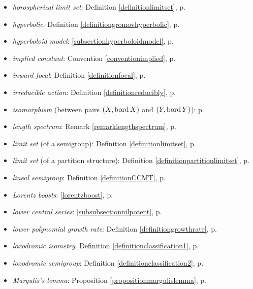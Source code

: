 \begin{itemize}
\item\emph{horospherical limit set}: Definition \ref{definitionlimitset}, p.\pageref{definitionlimitset}
\item\emph{hyperbolic}: Definition \ref{definitiongromovhyperbolic}, p.\pageref{definitiongromovhyperbolic}
\item\emph{hyperboloid model}: \6\ref{subsectionhyperboloidmodel}, p.\pageref{subsectionhyperboloidmodel}
\item\emph{implied constant}: Convention \ref{conventionimplied}, p.\pageref{conventionimplied}
\item\emph{inward focal}: Definition \ref{definitionfocal}, p.\pageref{definitionfocal}
\item\emph{irreducible action}: Definition \ref{definitionreducibly}, p.\pageref{definitionreducibly}
\item\emph{isomorphism} (between pairs $(X,\operatorname{bord} X)$ and $(Y,\operatorname{bord} Y)$): p.\pageref{subsectiontotallygeodesic}
\item\emph{length spectrum}: Remark \ref{remarklengthspectrum}, p.\pageref{remarklengthspectrum}
\item\emph{limit set} (of a semigroup): Definition \ref{definitionlimitset}, p.\pageref{definitionlimitset}
\item\emph{limit set} (of a partition structure): Definition \ref{definitionpartitionlimitset}, p.\pageref{definitionpartitionlimitset}
\item\emph{lineal semigroup}: Definition \ref{definitionCCMT}, p.\pageref{definitionCCMT}
\item\emph{Lorentz boosts}: \eqref{lorentzboost}, p.\pageref{lorentzboost}
\item\emph{lower central series}: \6\ref{subsubsectionnilpotent}, p.\pageref{subsubsectionnilpotent}
\item\emph{lower polynomial growth rate}: Definition \ref{definitiongrowthrate}, p.\pageref{definitiongrowthrate}
\item\emph{loxodromic isometry}: Definition \ref{definitionclassification1}, p.\pageref{definitionclassification1}
\item\emph{loxodromic semigroup}: Definition \ref{definitionclassification2}, p.\pageref{definitionclassification2}
\item\emph{Margulis's lemma}: Proposition \ref{propositionmargulislemma}, p.\pageref{propositionmargulislemma}

\end{itemize}

